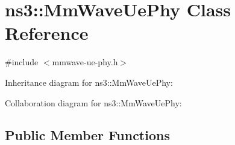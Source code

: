 \hypertarget{classns3_1_1MmWaveUePhy}{}\section{ns3\+:\+:Mm\+Wave\+Ue\+Phy Class Reference}
\label{classns3_1_1MmWaveUePhy}


{\ttfamily \#include $<$mmwave-\/ue-\/phy.\+h$>$}



Inheritance diagram for ns3\+:\+:Mm\+Wave\+Ue\+Phy\+:


Collaboration diagram for ns3\+:\+:Mm\+Wave\+Ue\+Phy\+:
\subsection*{Public Member Functions}
